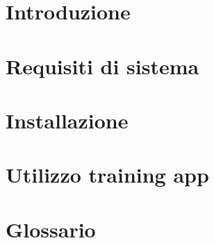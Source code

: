 \documentclass{article}
\begin{document}


\section{Introduzione}%
\label{sec:introduzione}


\newpage

\section{Requisiti di sistema}%
\label{sec:requisiti di sistema}


\newpage

\section{Installazione}%
\label{sec:installazione}


\newpage

\section{Utilizzo training app}%
\label{sec:utilizzo-training-app}


\newpage
\appendix
\setcounter{secnumdepth}{1} %
\section{Glossario}%
\label{sec:glossario}

\end{document}
